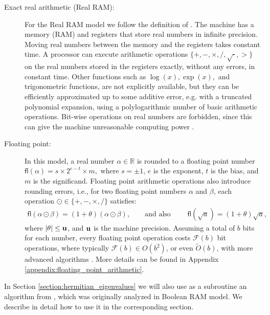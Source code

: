 \documentclass{article}
\newcommand{\fl}{\boldsymbol{\mathsf{fl}}}
\newcommand{\umach}{\textbf{\textup{u}}}
\newcommand{\flopcost}{\mathcal{F}}
\begin{document}
    \begin{description}
    \item[Exact real arithmetic (Real RAM):]
        For the Real RAM model we follow the  definition of \cite{erickson2022smoothing}. The machine has a memory (RAM) and registers that store real numbers in infinite precision. Moving real numbers between the memory and the registers takes constant time. A processor can execute arithmetic operations $\{+,-,\times,/,\sqrt\cdot,>\}$ on the real numbers stored in the registers exactly, without any errors, in constant time. Other functions such as $\log(x),\exp(x),$ and trigonometric functions, are not explicitly available, but they can be  efficiently approximated up to some additive error, e.g. with a truncated polynomial expansion, using a polylogarithmic number of basic arithmetic operations.
        Bit-wise operations on real numbers are forbidden, since this can give the machine unreasonable computing power \cite{hartmanis1974power,schonhage1979power,erickson2022smoothing}. 

    \item[Floating point:]
    In this model, a real number $\alpha\in\mathbb{R}$ is rounded to a floating point number $
        \fl(\alpha) = s\times 2^{e-t} \times m,$ where $s=\pm 1$, $e$ is the exponent, $t$ is the bias, and $m$ is the significand.
    Floating point arithmetic operations also introduce rounding errors, i.e., for two floating point numbers $\alpha$ and $\beta$, each  operation $\odot \in\{+,-,\times,/\}$ satisfies:
    \begin{align}
        \fl(\alpha\odot\beta) = (1+\theta)(\alpha\odot\beta),
        \qquad
        \text{and also }
        \qquad
        \fl(\sqrt{a})=(1+\theta)\sqrt{a},
        \label{eq:elementwise_flop_errors}
    \end{align} 
    where $|\theta|\leq\umach$, and $\umach$ is the machine precision. Assuming a total of $b$ bits for each number, every floating point operation costs $\flopcost(b)$ bit operations, where typically $\flopcost(b)\in O(b^2)$, or even $\widetilde O(b)$, with more advanced algorithms \cite{schonhage1971fast,furer2007faster,harvey2021integer}.
    More details can be found in Appendix \ref{appendix:floating_point_arithmetic}.
    \end{description}

    In Section \ref{section:hermitian_eigenvalues} we will also use as a subroutine an algorithm from \cite{bini1991parallel,bini1998computing}, which was originally analyzed in Boolean RAM model. We describe in detail how to use it in the corresponding section.
    
\end{document}

